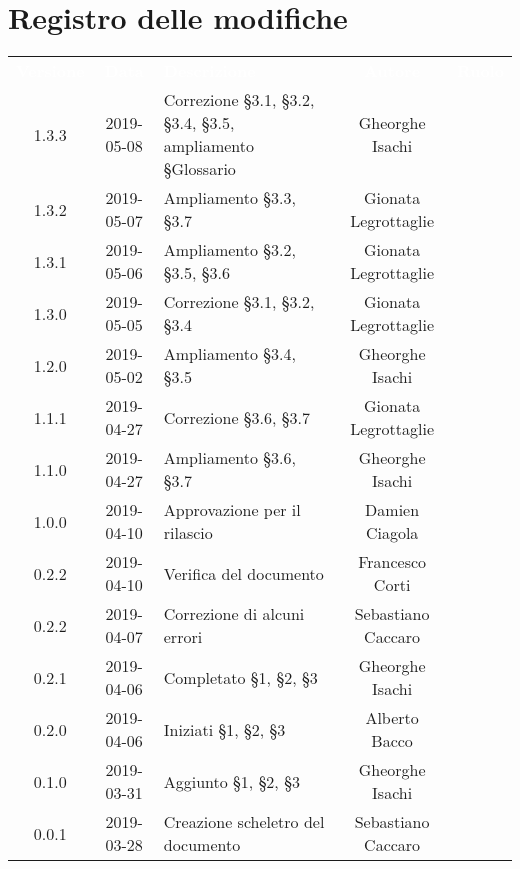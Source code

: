 \section*{Registro delle modifiche}
{
	\renewcommand{\arraystretch}{1.5}
	\centering
	\begin{longtable}{ c c C{6cm} c c }
		\textcolor{white}{\textbf{Versione}} & \textcolor{white}{\textbf{Data}} & \textcolor{white}{\textbf{Descrizione}} & \textcolor{white}{\textbf{Autore}} & \textcolor{white}{\textbf{Ruolo}}\\
		
		1.3.3 & 2019-05-08 & Correzione \S3.1, \S3.2, \S3.4, \S3.5, ampliamento \S Glossario & Gheorghe Isachi & \reda{} \\
		
		1.3.2 & 2019-05-07 & Ampliamento \S3.3, \S3.7 & Gionata Legrottaglie & \reda{} \\
		
		1.3.1 & 2019-05-06 & Ampliamento \S3.2, \S3.5, \S3.6 & Gionata Legrottaglie & \reda{} \\
				
		1.3.0 & 2019-05-05 & Correzione \S3.1, \S3.2, \S3.4 & Gionata Legrottaglie & \reda{} \\
				
		1.2.0 & 2019-05-02 & Ampliamento \S3.4, \S3.5 & Gheorghe Isachi & \reda{} \\	
		
		1.1.1 & 2019-04-27 & Correzione \S3.6, \S3.7 & Gionata Legrottaglie & \reda{} \\	
		
		1.1.0 & 2019-04-27 & Ampliamento \S3.6, \S3.7 & Gheorghe Isachi & \reda{} \\
		
		1.0.0 & 2019-04-10 & Approvazione per il rilascio & Damien Ciagola & \RdP{} \\ 
			
		0.2.2 & 2019-04-10 & Verifica del documento & Francesco Corti & \ver{} \\ 
		
		0.2.2 & 2019-04-07 & Correzione di alcuni errori & Sebastiano Caccaro & \reda{} \\ 

		0.2.1 & 2019-04-06 & Completato \S1, \S2, \S3 & Gheorghe Isachi & \reda{} \\
		
		0.2.0 & 2019-04-06 & Iniziati \S1, \S2, \S3 & Alberto Bacco & \reda{} \\
		
		0.1.0 & 2019-03-31 & Aggiunto \S1, \S2, \S3 & Gheorghe Isachi & \reda{} \\
		
		0.0.1 & 2019-03-28 & Creazione scheletro del documento & Sebastiano Caccaro & \reda{}
		
	\end{longtable}

}